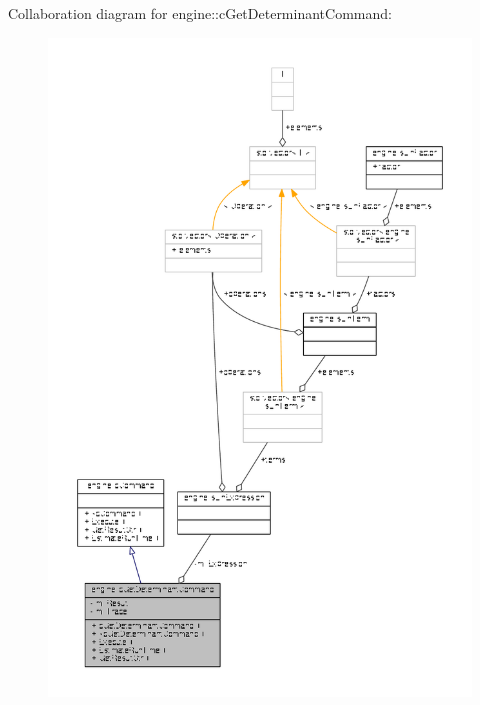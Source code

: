 Collaboration diagram for engine\-:\-:c\-Get\-Determinant\-Command\-:
\nopagebreak
\begin{figure}[H]
\begin{center}
\leavevmode
\includegraphics[width=350pt]{classengine_1_1cGetDeterminantCommand__coll__graph}
\end{center}
\end{figure}
